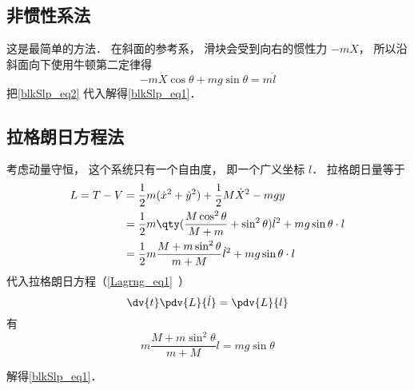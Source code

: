 \subsection{非惯性系法}
这是最简单的方法． 在斜面的参考系， 滑块会受到向右的惯性力 $-m\ddot X$， 所以沿斜面向下使用牛顿第二定律得
\begin{equation}
-m\ddot X\cos\theta + mg\sin\theta = m\ddot l
\end{equation}
把\autoref{blkSlp_eq2} 代入解得\autoref{blkSlp_eq1}．

\subsection{拉格朗日方程法}
考虑动量守恒， 这个系统只有一个自由度， 即一个广义坐标 $l$． 拉格朗日量等于
\begin{equation}
\begin{aligned}
L = T - V &= \frac12 m(\dot x^2 + \dot y^2) + \frac12 M \dot X^2 - mgy\\
&= \frac{1}{2}m \qty( \frac{M\cos^2\theta}{M + m}+\sin^2\theta) \dot l^2 + mg\sin\theta \cdot l\\
&=\frac{1}{2}m\frac{M+m\sin^2\theta}{m+M}\dot{l}^2+mg\sin\theta\cdot l
\end{aligned}
\end{equation}
代入拉格朗日方程（\autoref{Lagrng_eq1}~）
\begin{equation}
\dv{t} \pdv{L}{\dot l} = \pdv{L}{l}
\end{equation}
有
\begin{equation}
m\frac{M+m\sin^2\theta}{m+M}\ddot{l}=mg\sin\theta
\end{equation}

解得\autoref{blkSlp_eq1}．
